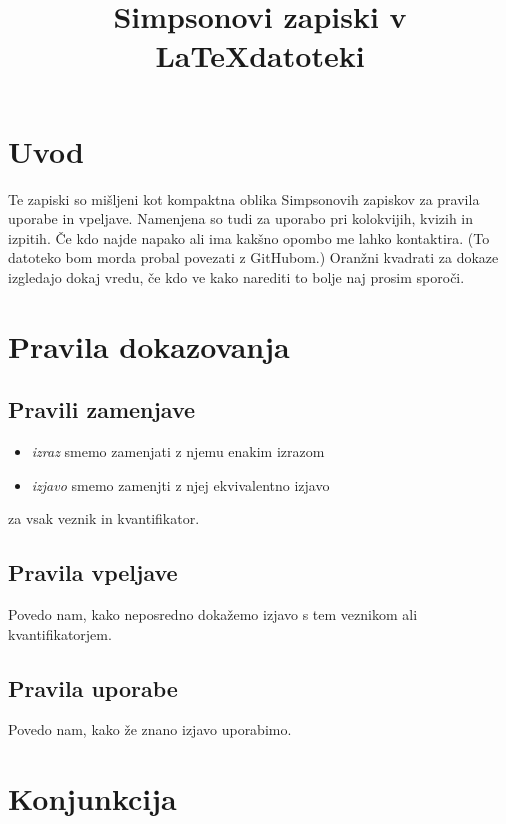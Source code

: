 \documentclass[12pt,a4paper]{article}
\title{Simpsonovi zapiski v \LaTeX  \space  datoteki}
\begin{document}
\maketitle

\break

\section*{Uvod}
Te zapiski so mišljeni kot kompaktna oblika Simpsonovih zapiskov za pravila uporabe in vpeljave.
Namenjena so tudi za uporabo pri kolokvijih, kvizih in izpitih. 
Če kdo najde napako ali ima kakšno opombo me lahko kontaktira. 
(To datoteko bom morda probal povezati z GitHubom.)
Oranžni kvadrati za dokaze izgledajo dokaj vredu, če kdo ve kako narediti to bolje naj prosim sporoči.

\break



\section{Pravila dokazovanja}
    \subsection*{Pravili zamenjave}
    \begin{itemize}
        \item \emph{izraz} smemo zamenjati z njemu enakim izrazom
        \item \emph{izjavo} smemo zamenjti z njej ekvivalentno izjavo
    \end{itemize}
    za vsak veznik in kvantifikator.

    \subsection*{Pravila vpeljave}
    Povedo nam, kako neposredno dokažemo izjavo s tem veznikom ali kvantifikatorjem.

    \subsection*{Pravila uporabe}
    Povedo nam, kako že znano izjavo uporabimo. 

\section{Konjunkcija}
\end{document}

